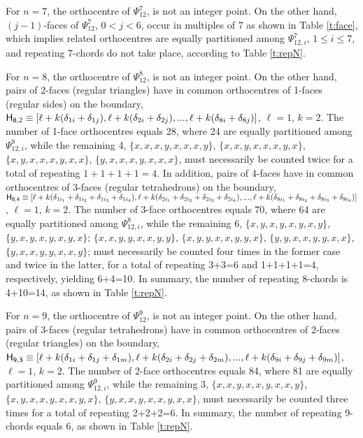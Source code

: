 \documentclass[12pt,a4paper]{article}
\begin{document}
For $n=7$, the orthocentre of $\Psi_{12}^7$, is not an integer point.   On the
other hand, $(j-1)$-faces of  $\Psi_{12}^7$, $0<j<6$, occur in multiples of 7
as shown in Table \ref{t:face}, which implies related orthocentres are
equally partitioned among $\Psi_{12,i}^7$, $1\le i\le7$, and repeating
7-chords do not take place, according to Table \ref{t:repN}.

For $n=8$, the orthocentre of $\Psi_{12}^8$, is not an integer point.   On the
other hand, pairs of 2-faces (regular triangles) have in common orthocentres
of 1-faces (regular sides) on
the boundary, ${\sf H_{8,2}}\equiv[\ell+k(\delta_{1i}+\delta_{1j}),
\ell+k(\delta_{2i}+\delta_{2j}),...,\ell+k(\delta_{8i}+\delta_{8j})]$,
$\ell=1$, $k=2$.   The number of 1-face orthocentres equals 28,
where 24 are equally partitioned among $\Psi_{12,i}^8$, while the remaining 4,
$\{x,x,x,y,x,x,x,y\}$, $\{x,x,y,x,x,x,y,x\}$, $\{x,y,x,x,x,y,x,x\}$,
$\{y,x,x,x,y,x,x,x\}$, must necessarily be counted twice for a total of
repeating $1+1+1+1=4$.   In addition, pairs of 4-faces have in common
orthocentres of 3-faces (regular tetrahedrons) on the boundary,
${\sf H_{8,4}}\equiv
[\ell+k(\delta_{1i_1}+\delta_{1i_2}+\delta_{1i_3}+\delta_{1i_4}),
\ell+k(\delta_{2i_1}+\delta_{2i_2}+\delta_{2i_3}+\delta_{2i_4}),...,
\ell+k(\delta_{8i_1}+\delta_{8i_2}+\delta_{8i_3}+\delta_{8i_4})]$,
$\ell=1$, $k=2$.   The number of 3-face orthocentres equals 70,
where 64 are equally partitioned among $\Psi_{12,i}^8$, while the remaining 6,
$\{x,y,x,y,x,y,x,y\}$, $\{y,x,y,x,y,x,y,x\}$; $\{x,x,y,y,x,x,y,y\}$,
$\{x,y,y,x,x,y,y,x\}$, $\{y,y,x,x,y,y,x,x\}$, $\{y,x,x,y,y,x,x,y\}$; must
necessarily be counted four times in the former case and twice in the latter,
for a total of repeating 3+3=6 and 1+1+1+1=4, respectively, yielding 6+4=10.
In summary, the number of
repeating 8-chords is 4+10=14, as shown in Table \ref{t:repN}. 

For $n=9$, the orthocentre of $\Psi_{12}^9$, is not an integer point.   On the
other hand, pairs of 3-faces (regular tetrahedrons) have in common
orthocentres of 2-faces (regular triangles) on the boundary,
${\sf H_{9,3}}\equiv[\ell+k(\delta_{1i}+\delta_{1j}+\delta_{1m}),
\ell+k(\delta_{2i}+\delta_{2j}+\delta_{2m}),...,
\ell+k(\delta_{9i}+\delta_{9j}+\delta_{9m})]$,
$\ell=1$, $k=2$.   The number of 2-face orthocentres equals 84,
where 81 are equally partitioned among $\Psi_{12,i}^9$, while the remaining 3,
$\{x,x,y,x,x,y,x,x,y\}$, $\{x,y,x,x,y,x,x,y,x\}$, $\{y,x,x,y,x,x,y,x,x\}$,
must necessarily be counted three times for a total of repeating 2+2+2=6.
In summary, the number of
repeating 9-chords equals 6, as shown in Table \ref{t:repN}. 
\end{document}
